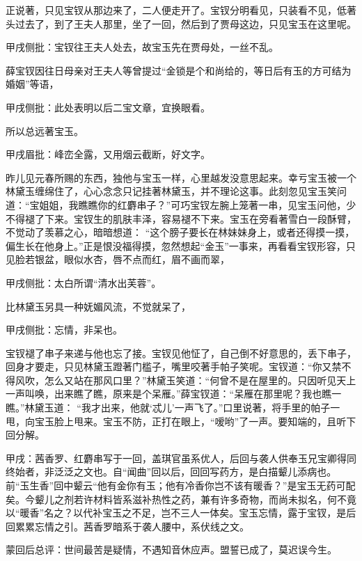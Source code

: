 \begin{parag}
    正说著，只见宝钗从那边来了，二人便走开了。宝钗分明看见，只装看不见，低著头过去了，到了王夫人那里，坐了一回，然后到了贾母这边，只见宝玉在这里呢。\begin{note}甲戌侧批：宝钗往王夫人处去，故宝玉先在贾母处，一丝不乱。\end{note}薛宝钗因往日母亲对王夫人等曾提过“金锁是个和尚给的，等日后有玉的方可结为婚姻”等语，\begin{note}甲戌侧批：此处表明以后二宝文章，宜换眼看。\end{note}所以总远著宝玉。\begin{note}甲戌眉批：峰峦全露，又用烟云截断，好文字。\end{note}昨儿见元春所赐的东西，独他与宝玉一样，心里越发没意思起来。幸亏宝玉被一个林黛玉缠绵住了，心心念念只记挂著林黛玉，并不理论这事。此刻忽见宝玉笑问道：“宝姐姐，我瞧瞧你的红麝串子？”可巧宝钗左腕上笼著一串，见宝玉问他，少不得褪了下来。宝钗生的肌肤丰泽，容易褪不下来。宝玉在旁看著雪白一段酥臂，不觉动了羡慕之心，暗暗想道： “这个膀子要长在林妹妹身上，或者还得摸一摸，偏生长在他身上。”正是恨没福得摸，忽然想起“金玉”一事来，再看看宝钗形容，只见脸若银盆，眼似水杏，唇不点而红，眉不画而翠，\begin{note}甲戌侧批：太白所谓“清水出芙蓉”。\end{note}比林黛玉另具一种妩媚风流，不觉就呆了，\begin{note}甲戌侧批：忘情，非呆也。\end{note}宝钗褪了串子来递与他也忘了接。宝钗见他怔了，自己倒不好意思的，丢下串子，回身才要走，只见林黛玉蹬著门槛子，嘴里咬著手帕子笑呢。宝钗道：“你又禁不得风吹，怎么又站在那风口里？”林黛玉笑道：“何曾不是在屋里的。只因听见天上一声叫唤，出来瞧了瞧，原来是个呆雁。”薛宝钗道：“呆雁在那里呢？我也瞧一瞧。”林黛玉道： “我才出来，他就‘忒儿’一声飞了。”口里说著，将手里的帕子一甩，向宝玉脸上甩来。宝玉不防，正打在眼上，“嗳哟”了一声。要知端的，且听下回分解。
\end{parag}


\begin{parag}
    \begin{note}甲戌：茜香罗、红麝串写于一回，盖琪官虽系优人，后回与袭人供奉玉兄宝卿得同终始者，非泛泛之文也。自“闻曲”回以后，回回写药方，是白描颦儿添病也。前“玉生香”回中颦云“他有金你有玉；他有冷香你岂不该有暖香？”是宝玉无药可配矣。今颦儿之剂若许材料皆系滋补热性之药，兼有许多奇物，而尚未拟名，何不竟以“暖香”名之？以代补宝玉之不足，岂不三人一体矣。宝玉忘情，露于宝钗，是后回累累忘情之引。茜香罗暗系于袭人腰中，系伏线之文。\end{note}
\end{parag}


\begin{parag}
    \begin{note}蒙回后总评：世间最苦是疑情，不遇知音休应声。盟誓已成了，莫迟误今生。\end{note}
\end{parag}
